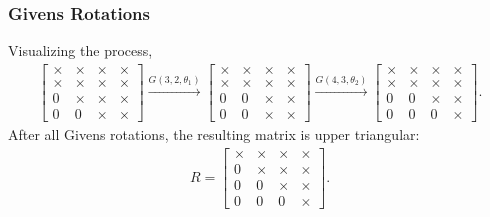 \documentclass{beamer}
\theoremstyle{remark}
\numberwithin{equation}{section}
\begin{document}
      \begin{frame}
        \frametitle{Givens Rotations}
        Visualizing the process,
        {\small
        \begin{align}
          \begin{bmatrix}
            \times & \times & \times & \times \\
            \times & \times & \times & \times \\
            0 & \times & \times & \times \\
            0 & 0 & \times & \times
          \end{bmatrix}
          \xrightarrow{G(3,2,\theta_1)}
          \begin{bmatrix}
            \times & \times & \times & \times \\
            \times & \times & \times & \times \\
            0 & 0 & \times & \times \\
            0 & 0 & \times & \times
          \end{bmatrix}
          \xrightarrow{G(4,3,\theta_2)}
          \begin{bmatrix}
            \times & \times & \times & \times \\
            \times & \times & \times & \times \\
            0 & 0 & \times & \times \\
            0 & 0 & 0 & \times
          \end{bmatrix}.
        \end{align}
        }
        After all Givens rotations, the resulting matrix is upper triangular:
        {\small
        \begin{align}
          R = \begin{bmatrix}
            \times & \times & \times & \times \\
            0 & \times & \times & \times \\
            0 & 0 & \times & \times \\
            0 & 0 & 0 & \times
          \end{bmatrix}.
        \end{align}
        }
      \end{frame}
\end{document}

